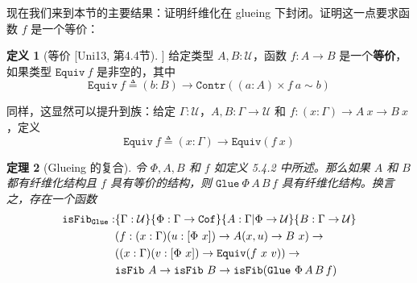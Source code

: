 \documentclass{ctexart}
\theoremstyle{plain}
\newtheorem{theorem}{定理}[section]
\theoremstyle{definition}
\newtheorem{definition}[theorem]{定义}
\theoremstyle{definition}
\theoremstyle{definition}
\theoremstyle{definition}
\numberwithin{equation}{section}
\begin{document}
现在我们来到本节的主要结果：证明纤维化在 glueing 下封闭。证明这一点要求函数 $ f $ 是一个等价：

\begin{definition}[等价 [Uni13, 第4.4节]]
给定类型 $A, B : \mathcal{U}$，函数 $f : A \to B$ 是一个\textbf{等价}，如果类型 $\mathtt{Equiv}\ f$ 是非空的，其中
\[
\mathtt{Equiv}\ f \triangleq (b : B) \to \mathtt{Contr}((a : A) \times f\ a \sim b)
\]
\end{definition}
同样，这显然可以提升到族：给定 $\Gamma : \mathcal{U}$，$A, B : \Gamma \to \mathcal{U}$ 和 $f : (x : \Gamma) \to A\ x \to B\ x$，定义
\[
\mathtt{Equiv}\ f \triangleq (x : \Gamma) \to \mathtt{Equiv}(f\ x)
\]
\begin{theorem}[Glueing 的复合]
令 $\Phi, A, B$ 和 $f$ 如定义 5.4.2 中所述。那么如果 $A$ 和 $B$ 都有纤维化结构且 $f$ 具有等价的结构，则 $\mathtt{Glue}\ \Phi\,A\,B\,f$ 具有纤维化结构。换言之，存在一个函数
\begin{align}
\mathtt{isFib}_{\mathtt{Glue}} : &\{\Gamma : \mathcal{U}\}\{\Phi : \Gamma \to \mathtt{Cof}\}\{A : \Gamma|\Phi \to \mathcal{U}\}\{B : \Gamma \to \mathcal{U}\} \\
&(f : (x : \Gamma)(u : [\Phi\ x]) \to A(x, u) \to B\ x) \to\notag\\
&((x : \Gamma)(v : [\Phi\ x]) \to \mathtt{Equiv}(f\ x\ v)) \to\notag\\
&\mathtt{isFib}\ A \to \mathtt{isFib}\ B \to \mathtt{isFib}(\mathtt{Glue}\ \Phi\,A\,B\,f)\notag
\end{align}
\end{theorem}
\end{document}

